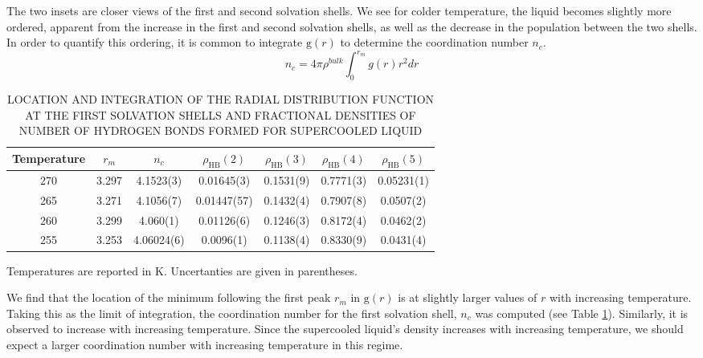 The two insets are closer views of the first and second solvation
shells. We see for colder temperature, the liquid becomes slightly
more ordered, apparent from the increase in the first and second
solvation shells, as well as the decrease in the population between
the two shells. In order to quantify this ordering, it is
common to integrate $\mathrm{g}(r)$ to determine the
coordination number $n_c$.
\begin{equation}\label{eq:nofr}
n_c = 4 \pi \rho^{bulk} \int_0^{r_m} g(r)r^2dr
\end{equation}


\begin{table}[h] \centering \caption{LOCATION AND INTEGRATION OF THE
    RADIAL DISTRIBUTION FUNCTION AT THE FIRST SOLVATION SHELLS AND
    FRACTIONAL DENSITIES OF NUMBER OF HYDROGEN BONDS FORMED FOR
    SUPERCOOLED LIQUID\label{tab:gofr}}
\begin{tabular}{ccccccc}
  \hline
  \hline
  Temperature & $r_m$ & $n_c$ & $\rho_\mathrm{HB}(2)$ & $\rho_\mathrm{HB}(3)$ & $\rho_\mathrm{HB}(4)$ & $\rho_\mathrm{HB}(5)$ \\
  \hline
  270 & 3.297 &4.1523(3) & 0.01645(3) & 0.1531(9) & 0.7771(3) & 0.05231(1)\\
  265 & 3.271 & 4.1056(7) & 0.01447(57) & 0.1432(4) & 0.7907(8) & 0.0507(2)\\
  260 & 3.299 & 4.060(1) & 0.01126(6) & 0.1246(3) & 0.8172(4) & 0.0462(2)\\
  255 & 3.253 & 4.06024(6)  & 0.0096(1) & 0.1138(4) & 0.8330(9) &
                                                                  0.0431(4) \\
  \hline
  \hline
\end{tabular}
\begin{flushleft}
Temperatures are reported in K. Uncertanties are given in parentheses.
\end{flushleft}
\end{table}

We find that the location of the minimum following the first peak
$r_m$ in $\mathrm{g}(r)$ is at slightly larger values of $r$ with
increasing temperature. Taking this as the limit of integration, the
coordination number for the first solvation shell, $n_c$ was computed
(see Table \ref{tab:gofr}). Similarly, it is observed to increase with
increasing temperature. Since the supercooled liquid's density
increases with increasing temperature, we should expect a larger
coordination number with increasing temperature in this regime.


